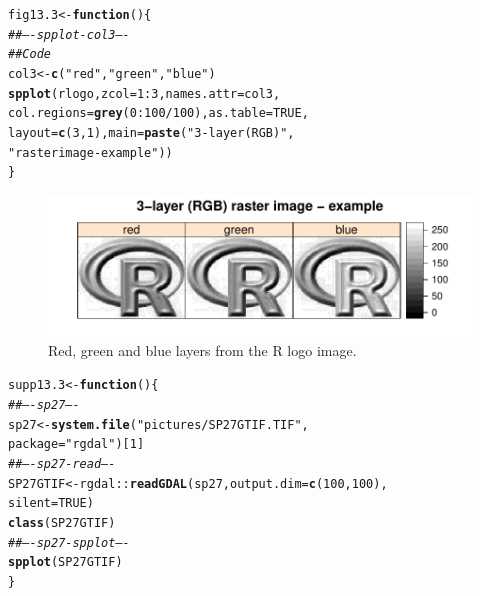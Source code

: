 \documentclass[12pt, a4paper,  BCOR=8.25mm, DIV=15]{scrartcl}\usepackage[]{graphicx}\usepackage[]{color}
\makeatletter
\def\maxwidth{ %
  \ifdim\Gin@nat@width>\linewidth
    \linewidth
  \else
    \Gin@nat@width
  \fi
}
\newcommand{\hlnum}[1]{\textcolor[rgb]{0.686,0.059,0.569}{#1}}%
\newcommand{\hlstr}[1]{\textcolor[rgb]{0.192,0.494,0.8}{#1}}%
\newcommand{\hlcom}[1]{\textcolor[rgb]{0.678,0.584,0.686}{\textit{#1}}}%
\newcommand{\hlopt}[1]{\textcolor[rgb]{0,0,0}{#1}}%
\newcommand{\hlstd}[1]{\textcolor[rgb]{0.345,0.345,0.345}{#1}}%
\newcommand{\hlkwa}[1]{\textcolor[rgb]{0.161,0.373,0.58}{\textbf{#1}}}%
\newcommand{\hlkwb}[1]{\textcolor[rgb]{0.69,0.353,0.396}{#1}}%
\newcommand{\hlkwc}[1]{\textcolor[rgb]{0.333,0.667,0.333}{#1}}%
\newcommand{\hlkwd}[1]{\textcolor[rgb]{0.737,0.353,0.396}{\textbf{#1}}}%
\newenvironment{kframe}{%
 \def\at@end@of@kframe{}%
 \ifinner\ifhmode%
  \def\at@end@of@kframe{\end{minipage}}%
  \begin{minipage}{\columnwidth}%
 \fi\fi%
 \def\FrameCommand##1{\hskip\@totalleftmargin \hskip-\fboxsep
 \colorbox{shadecolor}{##1}\hskip-\fboxsep
     \hskip-\linewidth \hskip-\@totalleftmargin \hskip\columnwidth}%
 \MakeFramed {\advance\hsize-\width
   \@totalleftmargin\z@ \linewidth\hsize
   \@setminipage}}%
 {\par\unskip\endMakeFramed%
 \at@end@of@kframe}
\newenvironment{knitrout}{}{} %
\makeatother
\begin{document}
\begin{knitrout}
\color{fgcolor}\begin{kframe}
\begin{alltt}
\hlstd{fig13.3} \hlkwb{<-} \hlkwa{function}\hlstd{()\{}
\hlcom{## ---- spplot-col3 ----}
\hlcom{## Code}
\hlstd{col3} \hlkwb{<-} \hlkwd{c}\hlstd{(}\hlstr{"red"}\hlstd{,}\hlstr{"green"}\hlstd{,}\hlstr{"blue"}\hlstd{)}
\hlkwd{spplot}\hlstd{(rlogo,} \hlkwc{zcol}\hlstd{=}\hlnum{1}\hlopt{:}\hlnum{3}\hlstd{,} \hlkwc{names.attr}\hlstd{=col3,}
       \hlkwc{col.regions}\hlstd{=}\hlkwd{grey}\hlstd{(}\hlnum{0}\hlopt{:}\hlnum{100}\hlopt{/}\hlnum{100}\hlstd{),} \hlkwc{as.table}\hlstd{=}\hlnum{TRUE}\hlstd{,}
       \hlkwc{layout}\hlstd{=}\hlkwd{c}\hlstd{(}\hlnum{3}\hlstd{,}\hlnum{1}\hlstd{),} \hlkwc{main}\hlstd{=}\hlkwd{paste}\hlstd{(}\hlstr{"3-layer (RGB)"}\hlstd{,}
       \hlstr{"raster image - example"}\hlstd{))}
\hlstd{\}}
\end{alltt}
\end{kframe}
\end{knitrout}

\begin{figure}
\begin{knitrout}
\color{fgcolor}

{\centering \includegraphics[width=\maxwidth]{figs/map-spplot-col3-13_3-1} 

}



\end{knitrout}
\caption{Red, green and blue layers from the R logo image.\label{fig:rlogo3}}
\end{figure}

\begin{knitrout}
\color{fgcolor}\begin{kframe}
\begin{alltt}
\hlstd{supp13.3} \hlkwb{<-} \hlkwa{function}\hlstd{()\{}
\hlcom{## ---- sp27 ----}
\hlstd{sp27} \hlkwb{<-} \hlkwd{system.file}\hlstd{(}\hlstr{"pictures/SP27GTIF.TIF"}\hlstd{,}
                    \hlkwc{package} \hlstd{=} \hlstr{"rgdal"}\hlstd{)[}\hlnum{1}\hlstd{]}
\hlcom{## ---- sp27-read ----}
\hlstd{SP27GTIF} \hlkwb{<-} \hlstd{rgdal}\hlopt{::}\hlkwd{readGDAL}\hlstd{(sp27,} \hlkwc{output.dim}\hlstd{=}\hlkwd{c}\hlstd{(}\hlnum{100}\hlstd{,}\hlnum{100}\hlstd{),}
                     \hlkwc{silent}\hlstd{=}\hlnum{TRUE}\hlstd{)}
\hlkwd{class}\hlstd{(SP27GTIF)}
\hlcom{## ---- sp27-spplot ----}
\hlkwd{spplot}\hlstd{(SP27GTIF)}
\hlstd{\}}
\end{alltt}
\end{kframe}
\end{knitrout}
\end{document}
